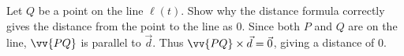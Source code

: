 {Let $Q$ be a point on the line $\ell(t)$. Show why the distance formula correctly gives the distance from the point to the line as $0$.
}
{Since both $P$ and $Q$ are on the line, $\vv{PQ}$ is parallel to $\vec d$. Thus $\vv{PQ}\times \vec d = \vec 0$, giving a distance of $0$.
}

